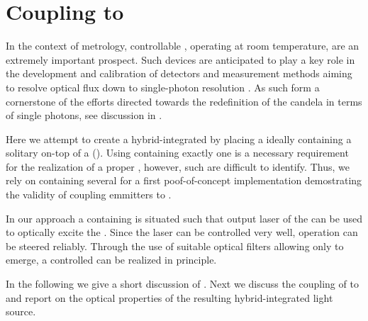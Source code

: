 
\section{Coupling \sivs to \Vcsels} \label{sec::coupling_vcsel}

	In the context of metrology, controllable \spss, operating at room temperature, are an extremely important prospect. Such devices are anticipated to play a key role in the development and calibration of detectors and measurement methods aiming to resolve optical flux down to single-photon resolution \cite{Vaigu2017}. As such \sps form a cornerstone of the efforts directed towards the redefinition of the candela in terms of single photons, see discussion in .

	Here we attempt to create a hybrid-integrated \sps by placing a \nd ideally containing a solitary \sivs on-top of a \vcsels (\VCSELs). Using \nds containing exactly one \sivs is a necessary requirement for the realization of a proper \sps, however, such \nds are difficult to identify. Thus, we rely on \nds containing several \sivs for a first poof-of-concept implementation demostrating the validity of coupling emmitters to \VCSELs.

	In our approach a \nd containing \sivs is situated such that output laser of the \VCSEL can be used to optically excite the \cc. Since the \VCSEL laser can be controlled very well, \siv operation can be steered reliably. Through the use of suitable optical filters allowing only \siv \fl to emerge, a controlled \sps can be realized in principle.

	In the following we give a short discussion of \VCSELs. Next we discuss the coupling of \sivs to \VCSELs and report on the optical properties of the resulting hybrid-integrated light source.

	\subsection{\Vcsels}\label{subsec::vcsel_structure}

